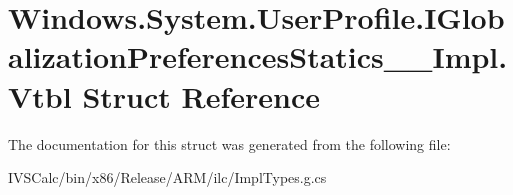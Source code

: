 \hypertarget{struct_windows_1_1_system_1_1_user_profile_1_1_i_globalization_preferences_statics_____impl_1_1_vtbl}{}\section{Windows.\+System.\+User\+Profile.\+I\+Globalization\+Preferences\+Statics\+\_\+\+\_\+\+Impl.\+Vtbl Struct Reference}
\label{struct_windows_1_1_system_1_1_user_profile_1_1_i_globalization_preferences_statics_____impl_1_1_vtbl}


The documentation for this struct was generated from the following file\+:\begin{DoxyCompactItemize}
\item 
I\+V\+S\+Calc/bin/x86/\+Release/\+A\+R\+M/ilc/Impl\+Types.\+g.\+cs\end{DoxyCompactItemize}
